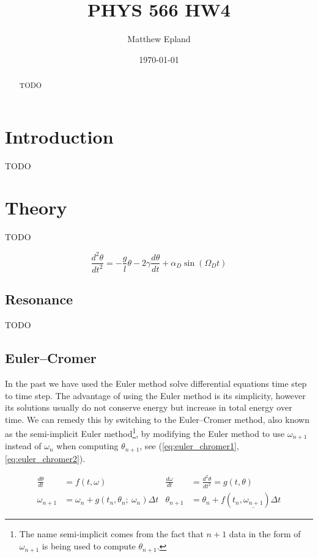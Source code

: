 \documentclass[notitlepage,aps,prd,nofootinbib]{revtex4-1}
\begin{document}
\title{PHYS 566 HW4}
\author{Matthew Epland}

\date{\today}

\begin{abstract}
TODO

\end{abstract}\maketitle


\section{Introduction}
\label{sec:intro}
TODO

\section{Theory}
\label{sec:theory}
TODO

\begin{equation} \label{eq:diff_eq}
\frac{d^2 \theta}{d t^2} = -\frac{g}{l}\theta - 2\gamma\frac{d \theta}{d t} + \alpha_{D}\sin\left(\Omega_{D} t\right)
\end{equation}

\subsection{Resonance}
\label{subsec:resonance}
TODO

\subsection{Euler--Cromer}
\label{subsec:eulercromer}
In the past we have used the Euler method solve differential equations time step to time step. The advantage of using the Euler method is its simplicity, however its solutions usually do not conserve energy but increase in total energy over time. We can remedy this by switching to the Euler--Cromer method, also known as the semi-implicit Euler method\footnote{The name semi-implicit comes from the fact that $n+1$ data in the form of $\omega_{n+1}$ is being used to compute $\theta_{n+1}$.}, by modifying the Euler method to use $\omega_{n+1}$ instead of $\omega_{n}$ when computing $\theta_{n+1}$, see (\ref{eq:euler_chromer1}, \ref{eq:euler_chromer2}).

\begin{align}
\frac{d \theta}{d t} &= f\left(t, \omega\right) &
\frac{d \omega}{d t} &= \frac{d^2 \theta}{d t^2} = g\left(t, \theta\right) \label{eq:euler_chromer1} \\
\omega_{n+1} &= \omega_{n} + g\left(t_{n}, \theta_{n};~\omega_{n}\right) \Delta t & 
\theta_{n+1} &= \theta_{n} + f\left(t_{n}, \underline{\omega_{n+1}}\right) \Delta t \label{eq:euler_chromer2}
\end{align}
\end{document}
